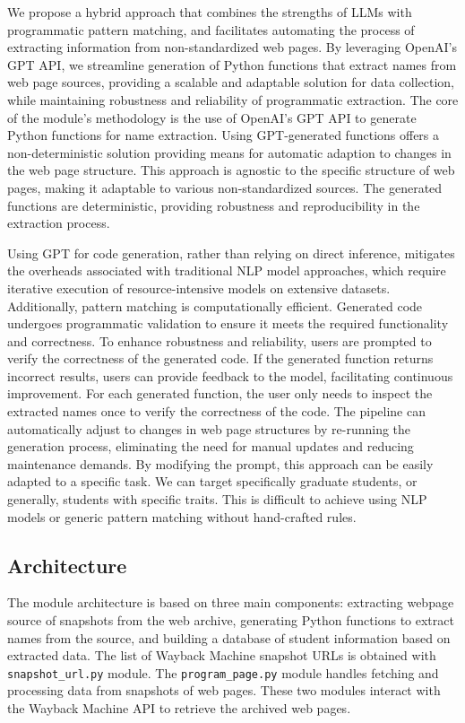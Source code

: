 \documentclass[11pt]{article}
\begin{document}
We propose a hybrid approach that combines the strengths of LLMs with programmatic pattern matching, and facilitates automating the process of extracting information from non-standardized web pages.
By leveraging OpenAI's GPT API, we streamline generation of Python functions that extract names from web page sources, providing a scalable and adaptable solution for data collection, while maintaining robustness and reliability of programmatic extraction.
%
The core of the module's methodology is the use of OpenAI's GPT API to generate Python functions for name extraction.
Using GPT-generated functions offers a non-deterministic solution providing means for automatic adaption to changes in the web page structure.
This approach is agnostic to the specific structure of web pages, making it adaptable to various non-standardized sources.
The generated functions are deterministic, providing robustness and reproducibility in the extraction process.

Using GPT for code generation, rather than relying on direct inference, mitigates the overheads associated with traditional NLP model approaches, which require iterative execution of resource-intensive models on extensive datasets. Additionally, pattern matching is computationally efficient.
%
Generated code undergoes programmatic validation to ensure it meets the required functionality and correctness. To enhance robustness and reliability, users are prompted to verify the correctness of the generated code. If the generated function returns incorrect results, users can provide feedback to the model, facilitating continuous improvement.
For each generated function, the user only needs to inspect the extracted names once to verify the correctness of the code.
%
The pipeline can automatically adjust to changes in web page structures by re-running the generation process, eliminating the need for manual updates and reducing maintenance demands.
By modifying the prompt, this approach can be easily adapted to a specific task.
We can target specifically graduate students, or generally, students with specific traits.
This is difficult to achieve using NLP models or generic pattern matching without hand-crafted rules.

\subsection{Architecture}

The module architecture is based on three main components: extracting webpage source of snapshots from the web archive, generating Python functions to extract names from the source, and building a database of student information based on extracted data.
%
The list of Wayback Machine snapshot URLs is obtained with \texttt{snapshot\_url.py} module.
The \texttt{program\_page.py} module handles fetching and processing data from snapshots of web pages. These two modules interact with the Wayback Machine API to retrieve the archived web pages.
\end{document}
